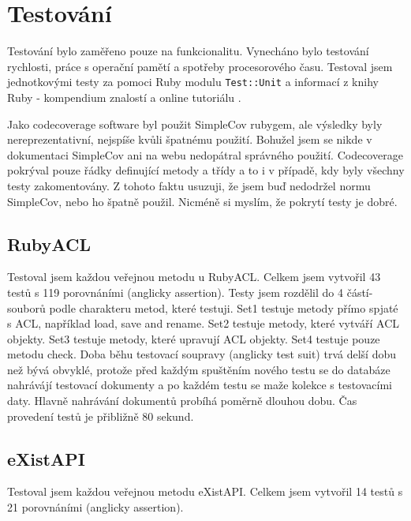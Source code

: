 \chapter{Testování}

Testování bylo zaměřeno pouze na funkcionalitu. Vynecháno bylo testování rychlosti, práce s operační pamětí a spotřeby procesorového času. Testoval jsem jednotkovými testy za pomoci Ruby modulu \verb|Test::Unit| a informací z knihy Ruby - kompendium znalostí \cite{Ruby} a online tutoriálu \cite{ibm:unittesting}.

Jako codecoverage software byl použit SimpleCov rubygem, ale výsledky byly nereprezentativní, nejspíše kvůli špatnému použití. Bohužel jsem se nikde v dokumentaci SimpleCov ani na webu nedopátral správného použití. Codecoverage pokrýval pouze řádky definující metody a třídy a to i v případě, kdy byly všechny testy zakomentovány. Z tohoto faktu usuzuji, že jsem buď nedodržel normu SimpleCov, nebo ho špatně použil. Nicméně si myslím, že pokrytí testy je dobré.

\section{RubyACL}
Testoval jsem každou veřejnou metodu u RubyACL. Celkem jsem vytvořil 43 testů s 119 porovnáními (anglicky assertion). Testy jsem rozdělil do 4 částí-souborů podle charakteru metod, které testuji. Set1 testuje metody přímo spjaté s ACL, například load, save and rename. Set2 testuje metody, které vytváří ACL objekty. Set3 testuje metody, které upravují ACL objekty. Set4 testuje pouze metodu check.
Doba běhu testovací soupravy (anglicky test suit) trvá delší dobu než bývá obvyklé, protože před každým spuštěním nového testu se do databáze nahrávájí testovací dokumenty a po každém testu se maže kolekce s testovacími daty. Hlavně nahrávání dokumentů probíhá poměrně dlouhou dobu. Čas provedení testů je přibližně 80 sekund.

\section{eXistAPI}
Testoval jsem každou veřejnou metodu eXistAPI. Celkem jsem vytvořil 14 testů s 21 porovnáními (anglicky assertion). 